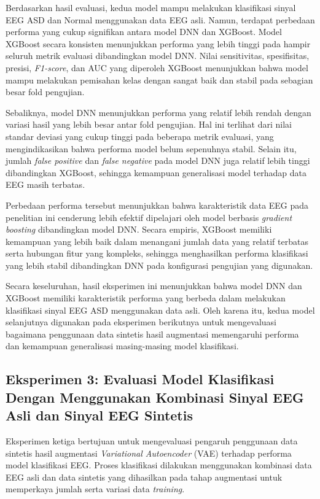 Berdasarkan hasil evaluasi, kedua model mampu melakukan klasifikasi sinyal EEG ASD dan Normal menggunakan data EEG asli. Namun, terdapat perbedaan performa yang cukup signifikan antara model DNN dan XGBoost. Model XGBoost secara konsisten menunjukkan performa yang lebih tinggi pada hampir seluruh metrik evaluasi dibandingkan model DNN. Nilai sensitivitas, spesifisitas, presisi, \textit{F1-score}, dan AUC yang diperoleh XGBoost menunjukkan bahwa model mampu melakukan pemisahan kelas dengan sangat baik dan stabil pada sebagian besar fold pengujian.

Sebaliknya, model DNN menunjukkan performa yang relatif lebih rendah dengan variasi hasil yang lebih besar antar fold pengujian. Hal ini terlihat dari nilai standar deviasi yang cukup tinggi pada beberapa metrik evaluasi, yang mengindikasikan bahwa performa model belum sepenuhnya stabil. Selain itu, jumlah \textit{false positive} dan \textit{false negative} pada model DNN juga relatif lebih tinggi dibandingkan XGBoost, sehingga kemampuan generalisasi model terhadap data EEG masih terbatas.

Perbedaan performa tersebut menunjukkan bahwa karakteristik data EEG pada penelitian ini cenderung lebih efektif dipelajari oleh model berbasis \textit{gradient boosting} dibandingkan model DNN. Secara empiris, XGBoost memiliki kemampuan yang lebih baik dalam menangani jumlah data yang relatif terbatas serta hubungan fitur yang kompleks, sehingga menghasilkan performa klasifikasi yang lebih stabil dibandingkan DNN pada konfigurasi pengujian yang digunakan.

Secara keseluruhan, hasil eksperimen ini menunjukkan bahwa model DNN dan XGBoost memiliki karakteristik performa yang berbeda dalam melakukan klasifikasi sinyal EEG ASD menggunakan data asli. Oleh karena itu, kedua model selanjutnya digunakan pada eksperimen berikutnya untuk mengevaluasi bagaimana penggunaan data sintetis hasil augmentasi memengaruhi performa dan kemampuan generalisasi masing-masing model klasifikasi.

\subsection{Eksperimen 3: Evaluasi Model Klasifikasi Dengan Menggunakan Kombinasi Sinyal EEG Asli dan Sinyal EEG Sintetis}

Eksperimen ketiga bertujuan untuk mengevaluasi pengaruh penggunaan data sintetis hasil augmentasi \textit{Variational Autoencoder} (VAE) terhadap performa model klasifikasi EEG. Proses klasifikasi dilakukan menggunakan kombinasi data EEG asli dan data sintetis yang dihasilkan pada tahap augmentasi untuk memperkaya jumlah serta variasi data \textit{training}.

